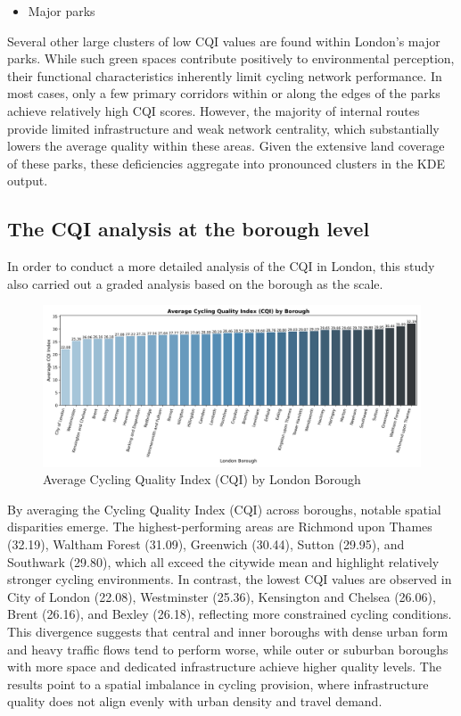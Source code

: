 \documentclass[
  12pt,
  oneside]{book}
\providecommand{\tightlist}{%
  \setlength{\itemsep}{0pt}\setlength{\parskip}{0pt}}
\begin{document}
\begin{itemize}
\tightlist
\item
  Major parks
\end{itemize}

Several other large clusters of low CQI values are found within London's major parks. While such green spaces contribute positively to environmental perception, their functional characteristics inherently limit cycling network performance. In most cases, only a few primary corridors within or along the edges of the parks achieve relatively high CQI scores. However, the majority of internal routes provide limited infrastructure and weak network centrality, which substantially lowers the average quality within these areas. Given the extensive land coverage of these parks, these deficiencies aggregate into pronounced clusters in the KDE output.

\subsection{The CQI analysis at the borough level}\label{the-cqi-analysis-at-the-borough-level}

In order to conduct a more detailed analysis of the CQI in London, this study also carried out a graded analysis based on the borough as the scale.

\begin{figure}

{\centering \includegraphics[width=1\linewidth]{general_images/AverageCQIbyBorough} 

}

\caption{Average Cycling Quality Index (CQI) by London Borough}\label{fig:AverageCQIbyBorough}
\end{figure}

By averaging the Cycling Quality Index (CQI) across boroughs, notable spatial disparities emerge. The highest-performing areas are Richmond upon Thames (32.19), Waltham Forest (31.09), Greenwich (30.44), Sutton (29.95), and Southwark (29.80), which all exceed the citywide mean and highlight relatively stronger cycling environments. In contrast, the lowest CQI values are observed in City of London (22.08), Westminster (25.36), Kensington and Chelsea (26.06), Brent (26.16), and Bexley (26.18), reflecting more constrained cycling conditions. This divergence suggests that central and inner boroughs with dense urban form and heavy traffic flows tend to perform worse, while outer or suburban boroughs with more space and dedicated infrastructure achieve higher quality levels. The results point to a spatial imbalance in cycling provision, where infrastructure quality does not align evenly with urban density and travel demand.
\end{document}
